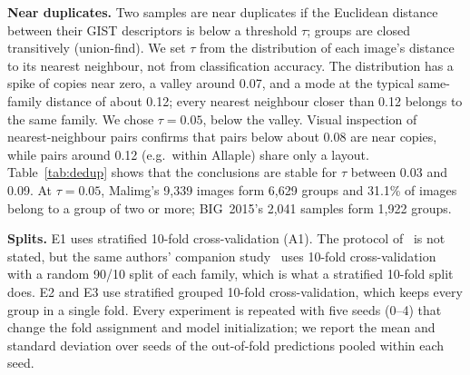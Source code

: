 \documentclass[conference]{IEEEtran}
\begin{document}
\textbf{Near duplicates.} Two samples are near duplicates if the Euclidean distance
between their GIST descriptors is below a threshold $\tau$; groups are closed
transitively (union-find). We set $\tau$ from the distribution of each image's
distance to its nearest neighbour, not from classification accuracy.
The distribution has a spike of copies near zero, a valley around
0.07, and a mode at the typical same-family distance of about 0.12;
every nearest neighbour closer than 0.12 belongs to the same family. We chose
$\tau = 0.05$, below the valley. Visual inspection of nearest-neighbour pairs confirms
that pairs below about 0.08 are near copies, while pairs around 0.12 (e.g.\ within
Allaple) share only a layout. Table~\ref{tab:dedup} shows that the conclusions are
stable for $\tau$ between 0.03 and 0.09.
At $\tau = 0.05$, Malimg's 9,339 images form 6,629 groups and
31.1\% of images belong to a group of two or more; BIG~2015's 2,041 samples
form 1,922 groups.

\textbf{Splits.} E1 uses stratified 10-fold cross-validation (A1). The protocol
of~\cite{nataraj2011images} is not stated, but the same authors' companion
study~\cite{nataraj2011comparative} uses 10-fold cross-validation with a random 90/10
split of each family, which is what a stratified 10-fold split does.
E2 and E3 use stratified grouped 10-fold cross-validation, which keeps every group in
a single fold. Every experiment is repeated with five seeds (0--4) that change the
fold assignment and model initialization; we report the mean and standard deviation
over seeds of the out-of-fold predictions pooled within each seed.
\end{document}

